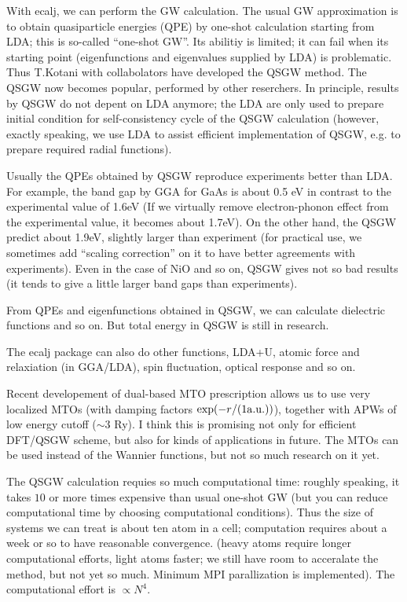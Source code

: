 \documentclass[a4paper,10pt,epsf,fleqn]{article}
\begin{document}
With ecalj, we can perform the GW calculation. 
The usual GW approximation is to obtain
quasiparticle energies (QPE) by one-shot calculation
starting from LDA; this is so-called ``one-shot GW''.
Its abilitiy is limited; it can fail when its starting point 
(eigenfunctions and eigenvalues supplied by LDA) is problematic.
Thus T.Kotani with collabolators have developed the QSGW method. 
The QSGW now becomes popular, performed by other reserchers. 
In principle, results by QSGW do not depent on LDA anymore; 
the LDA are only used to prepare initial condition for
self-consistency cycle of the QSGW calculation (however, 
exactly speaking, we use LDA to assist efficient implementation of QSGW,
e.g. to prepare required radial functions). 

Usually the QPEs obtained by QSGW reproduce experiments better than LDA.
For example, the band gap by GGA for GaAs is about 0.5 eV in contrast
to the experimental value of 1.6eV (If we virtually remove electron-phonon
effect from the experimental value, it becomes about 1.7eV). 
On the other hand, the QSGW predict about 1.9eV, slightly larger
than experiment (for practical use, we sometimes add 
``scaling correction'' on it to have better agreements with experiments).
Even in the case of NiO and so on, QSGW gives not so bad results (it
tends to give a little larger band gaps than experiments).

From QPEs and eigenfunctions obtained in QSGW, we can
calculate dielectric functions and so on.
But total energy in QSGW is still in research.

The ecalj package can also do other functions, 
LDA+U, atomic force and relaxiation (in GGA/LDA), 
spin fluctuation, optical response and so on.

Recent developement of 
dual-based MTO prescription allows us to use very localized MTOs
(with damping factors $\exp(-r/(1{\rm a.u.}))$), together 
with APWs of low energy cutoff ($\sim 3$ Ry). 
I think this is promising not only for efficient DFT/QSGW scheme, 
but also for kinds of applications in future.
The MTOs can be used instead of the Wannier functions,
but not so much research on it yet.

The QSGW calculation requies so much computational time:
roughly speaking, it takes $10$ or more times expensive than usual
one-shot GW (but you can reduce computational time by choosing
computational conditions).
Thus the size of systems we can treat is about ten atom in a cell;
computation requires about a week or so to have reasonable convergence.
(heavy atoms require longer computational efforts,
light atoms faster; we still have room to acceralate the method, but not
yet so much. Minimum MPI parallization is implemented).
The computational effort is $\propto N^4$.
\end{document}
